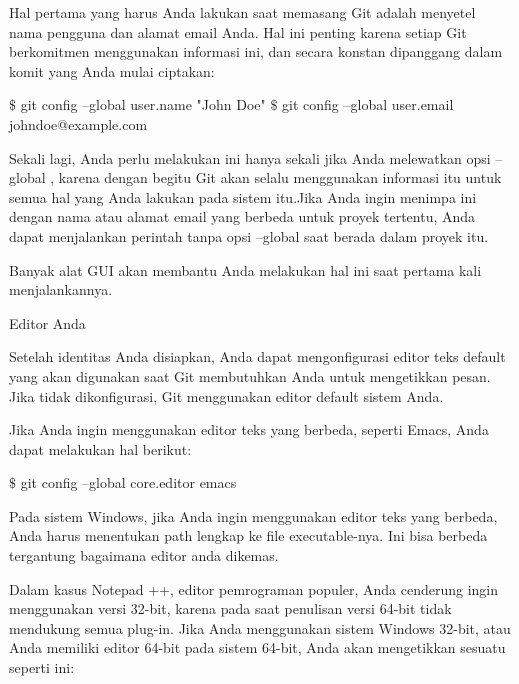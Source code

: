 \noindent 
Hal pertama yang harus Anda lakukan saat memasang Git adalah menyetel nama pengguna dan alamat email Anda. $  $Hal ini penting karena setiap Git berkomitmen menggunakan informasi ini, dan secara konstan dipanggang dalam komit yang Anda mulai ciptakan: \par
\vspace{12pt}
\noindent 
  $  \$  $ git config --global user.name "John Doe"  $  \$  $ git config --global user.email johndoe@example.com \par
\vspace{12pt}
\noindent 
Sekali lagi, Anda perlu melakukan ini hanya sekali jika Anda melewatkan opsi $  $--global $  $, karena dengan begitu Git akan selalu menggunakan informasi itu untuk semua hal yang Anda lakukan pada sistem itu.Jika Anda ingin menimpa ini dengan nama atau alamat email yang berbeda untuk proyek tertentu, Anda dapat menjalankan perintah tanpa opsi $  $--global $  $saat berada dalam proyek itu. \par
\vspace{12pt}
\noindent 
Banyak alat GUI akan membantu Anda melakukan hal ini saat pertama kali menjalankannya. \par
\vspace{12pt}
\noindent 
Editor Anda \par
\vspace{12pt}
\noindent 
Setelah identitas Anda disiapkan, Anda dapat mengonfigurasi editor teks default yang akan digunakan saat Git membutuhkan Anda untuk mengetikkan pesan. $  $Jika tidak dikonfigurasi, Git menggunakan editor default sistem Anda. \par
\vspace{12pt}
\noindent 
Jika Anda ingin menggunakan editor teks yang berbeda, seperti Emacs, Anda dapat melakukan hal berikut: \par
\vspace{12pt}
\noindent 
  $  \$  $ git config --global core.editor emacs  \par
\vspace{12pt}
\noindent 
Pada sistem Windows, jika Anda ingin menggunakan editor teks yang berbeda, Anda harus menentukan path lengkap ke file executable-nya. $  $Ini bisa berbeda tergantung bagaimana editor anda dikemas. \par
\vspace{12pt}
\noindent 
Dalam kasus Notepad ++, editor pemrograman populer, Anda cenderung ingin menggunakan versi 32-bit, karena pada saat penulisan versi 64-bit tidak mendukung semua plug-in. $  $Jika Anda menggunakan sistem Windows 32-bit, atau Anda memiliki editor 64-bit pada sistem 64-bit, Anda akan mengetikkan sesuatu seperti ini: \par
